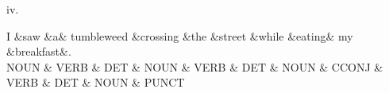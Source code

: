 iv. \\
 \begin{center}
 {
 \begin{dependency}
 \begin{deptext}
 I \&saw \&a\& tumbleweed \&crossing \&the \&street \&while \&eating\& my \&breakfast\&.  \\
 NOUN \& VERB \& DET  \& NOUN \& VERB \& DET \& NOUN  \& CCONJ     \& VERB     \& DET \& NOUN  \& PUNCT \\
 \end{deptext}
 \end{dependency}
 }
 \end{center}